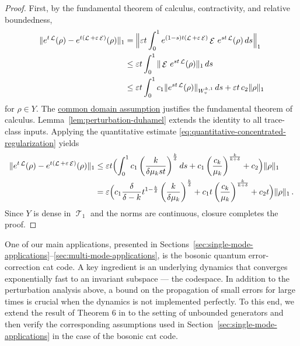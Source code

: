 \documentclass[11pt]{article}
\theoremstyle{myplain}
\theoremstyle{mydefinition}
\theoremstyle{remark}
\DeclareMathOperator{\cE}{\mathcal{E}}
\DeclareMathOperator{\cL}{\mathcal{L}}
\DeclareMathOperator{\cT}{\mathcal{T}}
\DeclareMathOperator{\1}{\mathds{1}}
\begin{document}
        \begin{proof}
            First, by the fundamental theorem of calculus, contractivity, and relative boundedness,
            \begin{equation*}
                \begin{aligned}
                    \|e^{t\cL}(\rho)-e^{t(\cL+\varepsilon\cE)}(\rho)\|_1
                    &=\Bigl\|\varepsilon t \int_{0}^1 e^{(1-s)t(\cL+\varepsilon\cE)}\cE\, e^{st\cL}(\rho)\, ds \Bigr\|_1 \\
                    &\leq \varepsilon t \int_{0}^1 \|\cE\, e^{st\cL}(\rho)\|_1\, ds\\
                    &\leq \varepsilon t \int_{0}^1 c_1\| e^{st\cL}(\rho)\|_{W^{k,1}_v}\, ds + \varepsilon t\, c_2\|\rho\|_1
                \end{aligned}
            \end{equation*}
            for $\rho\in Y$. The \hyperref[assum:perturbation-common-domain]{common domain assumption} justifies the fundamental theorem of calculus. Lemma~\ref{lem:perturbation-duhamel} extends the identity to all trace-class inputs. Applying the quantitative estimate \eqref{eq:quantitative-concentrated-regularization} yields
            \begin{equation*}
                \begin{aligned}
                    \|e^{t\cL}(\rho)-e^{t(\cL+\varepsilon\cE)}(\rho)\|_1
                    &\leq \varepsilon t \Bigl(\int_{0}^1 c_1 \left(\frac{k}{\delta \mu_k s t}\right)^{\frac{k}{\delta}} ds + c_1\left( \frac{c_k}{\mu_k} \right)^{\frac{k}{k + \delta}} + c_2\Bigr)\|\rho\|_1 \\
                    &=\varepsilon \Bigl( c_1 \frac{\delta}{\delta-k} t^{1-\frac{k}{\delta}} \left(\frac{k}{\delta \mu_k}\right)^{\frac{k}{\delta}} + c_1 t\left(\frac{c_k}{\mu_k}\right)^{\frac{k}{k+\delta}} + c_2 t\Bigr)\|\rho\|_1\,.
                \end{aligned}
            \end{equation*}
            Since $Y$ is dense in $\cT_1$ and the norms are continuous, closure completes the proof.
        \end{proof}

        One of our main applications, presented in Sections~\ref{sec:single-mode-applications}--\ref{sec:multi-mode-applications}, is the bosonic quantum error-correction cat code. A key ingredient is an underlying dynamics that converges exponentially fast to an invariant subspace --- the codespace. In addition to the perturbation analysis above, a bound on the propagation of small errors for large times is crucial when the dynamics is not implemented perfectly. To this end, we extend the result of Theorem 6 in \cite{Szehr.2013} to the setting of unbounded generators and then verify the corresponding assumptions used in Section~\ref{sec:single-mode-applications} in the case of the bosonic cat code.
\end{document}
